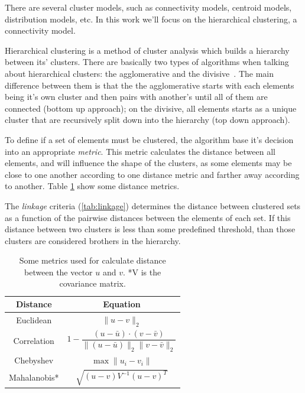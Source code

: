 \documentclass[12pt]{report}
\begin{document}
There are several cluster models, such as connectivity models, centroid models, distribution models, etc. In this work we'll focus on the hierarchical clustering, a connectivity model.

Hierarchical clustering is a method of cluster analysis which builds a hierarchy between its' clusters. There are basically two types of algorithms when talking about hierarchical clusters: the agglomerative and the divisive~\citep{rokach2005clustering}. The main difference between them is that the the agglomerative starts with each elements being it's own cluster and then pairs with another's until all of them are connected (bottom up approach); on the divisive, all elements starts as a unique cluster that are recursively split down into the hierarchy (top down approach).

To define if a set of elements must be clustered, the algorithm base it's decision into an appropriate \textit{metric}. This metric calculates the distance between all elements, and will influence the shape of the clusters, as some elements may be close to one another according to one distance metric and farther away according to another. Table \ref{tab:distances} show some distance metrics.

The \textit{linkage} criteria (\ref{tab:linkage}) determines the distance between clustered sets as a function of the pairwise distances between the elements of each set. If this distance between two clusters is less than some predefined threshold, than those clusters are considered brothers in the hierarchy.

\begin{table}
\begin{center}
\begin{tabular}{cc}
\toprule
\textbf{Distance} & \textbf{Equation}\\
\midrule
Euclidean & $\| u -v \|_{2}$\\[0.3cm]
Correlation & $1 - \dfrac{(u - \bar{u}) \cdot (v-\bar{v})}{\|(u - \bar{u}) \|_{2} \|v-\bar{v} \|_{2}}  $\\[0.3cm] 
Chebyshev & $\max\|u_i-v_i \|$ \\[0.3cm]
Mahalanobis* & $ \sqrt{ (u-v)V^{-1} (u-v)^{T}} $ \\
\bottomrule
\end{tabular}
\caption{Some metrics used for calculate distance between the vector $u$ and $v$. *V is the covariance matrix.}
\label{tab:distances}
\end{center}
\end{table}
\end{document}
